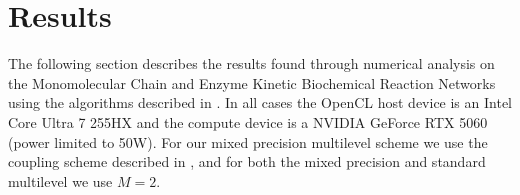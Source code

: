 \section{Results}\label{sec:results}
The following section describes the results found through numerical analysis on the Monomolecular Chain and Enzyme Kinetic Biochemical Reaction Networks using the algorithms described in . In all cases the OpenCL host device is an Intel Core Ultra 7 255HX and the compute device is a NVIDIA GeForce RTX 5060 (power limited to 50W). For our mixed precision multilevel scheme we use the coupling scheme described in , and for both the mixed precision and standard multilevel we use $M=2$. 





%

